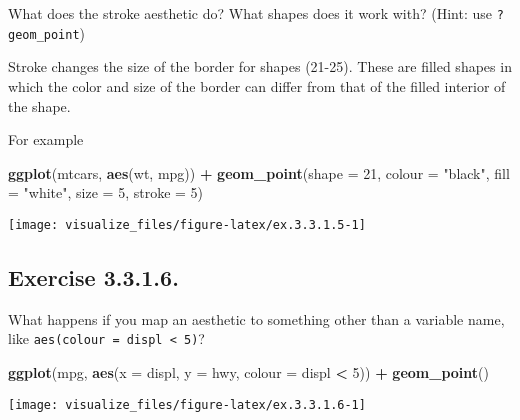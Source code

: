 \documentclass[]{book}
\newenvironment{Shaded}{\begin{snugshade}}{\end{snugshade}}
\newcommand{\DataTypeTok}[1]{\textcolor[rgb]{0.13,0.29,0.53}{#1}}
\newcommand{\DecValTok}[1]{\textcolor[rgb]{0.00,0.00,0.81}{#1}}
\newcommand{\KeywordTok}[1]{\textcolor[rgb]{0.13,0.29,0.53}{\textbf{#1}}}
\newcommand{\NormalTok}[1]{#1}
\newcommand{\OperatorTok}[1]{\textcolor[rgb]{0.81,0.36,0.00}{\textbf{#1}}}
\newcommand{\StringTok}[1]{\textcolor[rgb]{0.31,0.60,0.02}{#1}}
\theoremstyle{plain}
\theoremstyle{remark}
\begin{document}
What does the stroke aesthetic do? What shapes does it work with? (Hint:
use \texttt{?geom\_point})

Stroke changes the size of the border for shapes (21-25). These are
filled shapes in which the color and size of the border can differ from
that of the filled interior of the shape.

For example

\begin{Shaded}
\begin{Highlighting}[]
\KeywordTok{ggplot}\NormalTok{(mtcars, }\KeywordTok{aes}\NormalTok{(wt, mpg)) }\OperatorTok{+}
\StringTok{  }\KeywordTok{geom_point}\NormalTok{(}\DataTypeTok{shape =} \DecValTok{21}\NormalTok{, }\DataTypeTok{colour =} \StringTok{"black"}\NormalTok{, }\DataTypeTok{fill =} \StringTok{"white"}\NormalTok{, }\DataTypeTok{size =} \DecValTok{5}\NormalTok{, }\DataTypeTok{stroke =} \DecValTok{5}\NormalTok{)}
\end{Highlighting}
\end{Shaded}

\begin{center}\texttt{[image: visualize\_files/figure-latex/ex.3.3.1.5-1]} \end{center}

\hypertarget{exercise-3.3.1.6.}{%
\subsection*{\texorpdfstring{Exercise
{3.3.1.6}.}{Exercise 3.3.1.6.}}\label{exercise-3.3.1.6.}}

What happens if you map an aesthetic to something other than a variable
name, like \texttt{aes(colour\ =\ displ\ \textless{}\ 5)}?

\begin{Shaded}
\begin{Highlighting}[]
\KeywordTok{ggplot}\NormalTok{(mpg, }\KeywordTok{aes}\NormalTok{(}\DataTypeTok{x =}\NormalTok{ displ, }\DataTypeTok{y =}\NormalTok{ hwy, }\DataTypeTok{colour =}\NormalTok{ displ }\OperatorTok{<}\StringTok{ }\DecValTok{5}\NormalTok{)) }\OperatorTok{+}
\StringTok{  }\KeywordTok{geom_point}\NormalTok{()}
\end{Highlighting}
\end{Shaded}

\begin{center}\texttt{[image: visualize\_files/figure-latex/ex.3.3.1.6-1]} \end{center}
\end{document}
